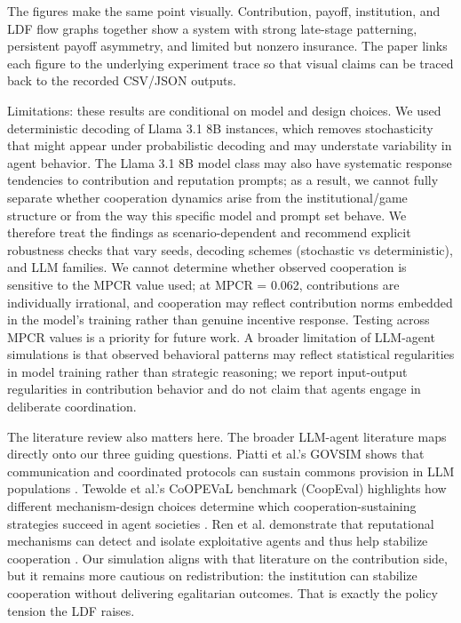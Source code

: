\documentclass[12pt,letterpaper]{article}
\begin{document}
The figures make the same point visually. Contribution, payoff, institution, and LDF flow graphs together show a system with strong late-stage patterning, persistent payoff asymmetry, and limited but nonzero insurance. The paper links each figure to the underlying experiment trace so that visual claims can be traced back to the recorded CSV/JSON outputs.

Limitations: these results are conditional on model and design choices. We used deterministic decoding of Llama 3.1 8B instances, which removes stochasticity that might appear under probabilistic decoding and may understate variability in agent behavior. The Llama 3.1 8B model class may also have systematic response tendencies to contribution and reputation prompts; as a result, we cannot fully separate whether cooperation dynamics arise from the institutional/game structure or from the way this specific model and prompt set behave. We therefore treat the findings as scenario-dependent and recommend explicit robustness checks that vary seeds, decoding schemes (stochastic vs deterministic), and LLM families. We cannot determine whether observed cooperation is sensitive to the MPCR value used; at MPCR = 0.062, contributions are individually irrational, and cooperation may reflect contribution norms embedded in the model's training rather than genuine incentive response. Testing across MPCR values is a priority for future work. A broader limitation of LLM-agent simulations is that observed behavioral patterns may reflect statistical regularities in model training rather than strategic reasoning; we report input-output regularities in contribution behavior and do not claim that agents engage in deliberate coordination.

The literature review also matters here. The broader LLM-agent literature maps directly onto our three guiding questions. Piatti et al.'s GOVSIM shows that communication and coordinated protocols can sustain commons provision in LLM populations \citep{piatti2024}. Tewolde et al.'s CoOPEVaL benchmark (CoopEval) highlights how different mechanism-design choices determine which cooperation-sustaining strategies succeed in agent societies \citep{tewolde2026}. Ren et al. demonstrate that reputational mechanisms can detect and isolate exploitative agents and thus help stabilize cooperation \citep{ren2025}. Our simulation aligns with that literature on the contribution side, but it remains more cautious on redistribution: the institution can stabilize cooperation without delivering egalitarian outcomes. That is exactly the policy tension the LDF raises.
\end{document}
